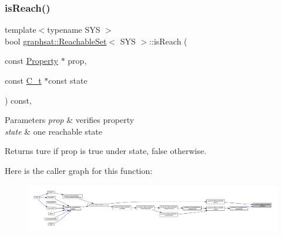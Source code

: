 \mbox{\label{classgraphsat_1_1_reachable_set_a80b137140d25e39d9c0076b4d9afa1e0}} 
\subsubsection{\texorpdfstring{isReach()}{isReach()}}
{\footnotesize\ttfamily template$<$typename S\+YS $>$ \\
bool \mbox{\hyperlink{classgraphsat_1_1_reachable_set}{graphsat\+::\+Reachable\+Set}}$<$ S\+YS $>$\+::is\+Reach (\begin{DoxyParamCaption}\item[{const \mbox{\hyperlink{classgraphsat_1_1_property}{Property}} $\ast$}]{prop,  }\item[{const \mbox{\hyperlink{classgraphsat_1_1_reachable_set_a0b7981a216ec4c46be913e08d5f0cd07}{C\+\_\+t}} $\ast$const}]{state }\end{DoxyParamCaption}) const\hspace{0.3cm}{\ttfamily [inline]}, {\ttfamily [private]}}


\begin{DoxyParams}{Parameters}
{\em prop} & verifies property \\
\hline
{\em state} & one reachable state\\
\hline
\end{DoxyParams}
\begin{DoxyReturn}{Returns}
ture if prop is true under state, false otherwise. 
\end{DoxyReturn}
Here is the caller graph for this function\+:
\nopagebreak
\begin{figure}[H]
\begin{center}
\leavevmode
\includegraphics[width=350pt]{classgraphsat_1_1_reachable_set_a80b137140d25e39d9c0076b4d9afa1e0_icgraph}
\end{center}
\end{figure}
\mbox{\label{classgraphsat_1_1_reachable_set_a1de529cd581827bc7f43acea384af78b}} 
